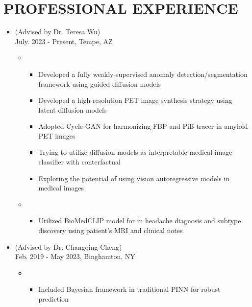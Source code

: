 \documentclass[10pt]{article}
\begin{document}
\section*{PROFESSIONAL EXPERIENCE}
\begin{itemize}
	\item {} (Advised by Dr. Teresa Wu)\\
        \hfill{July. 2023 - Present, Tempe, AZ}
        \begin{itemize}[label=$\bullet$]
            \item {}
            \begin{itemize}[label=$-$]
				\item Developed a fully weakly-supervised anomaly detection/segmentation framework using guided diffusion models
				\item Developed a high-resolution PET image synthesis strategy using latent diffusion models
				\item Adopted Cycle-GAN for harmonizing FBP and PiB tracer in amyloid PET images
				\item Trying to utilize diffusion models as interpretable medical image classifier with conterfactual
				\item Exploring the potential of using vision autoregressive models in medical images 
			\end{itemize}

            \item {}
            \begin{itemize}[label=$-$]
				\item Utilized BioMedCLIP model for in headache diagnosis and subtype discovery using patient's MRI and clinical notes
			\end{itemize}
        \end{itemize}
        
        
	\item {} (Advised by Dr. Changqing Cheng)\\
	\hfill{Feb. 2019 - May 2023, Binghamton, NY}
	\begin{itemize}[label=$\bullet$]
	
	    \item {}
		\begin{itemize}[label=$-$]
	        \item Included Bayesian framework in traditional PINN for robust prediction
		\end{itemize}
		

\end{itemize}
\end{itemize}
\end{document}
